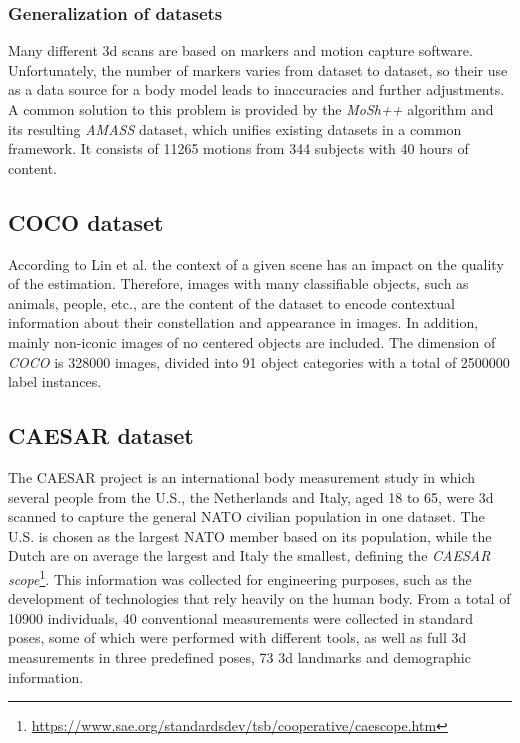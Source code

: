 \subsubsection{Generalization of datasets}
Many different 3d scans are based on markers and motion capture software. Unfortunately, the number of markers varies from dataset to dataset, so their use as a data source for a body model leads to inaccuracies and further adjustments. A common solution to this problem is provided by the \emph{MoSh++} algorithm and its resulting \emph{AMASS} dataset, which unifies existing datasets in a common framework. It consists of 11265 motions from 344 subjects with 40 hours of content.\cite{amass}

\subsection{COCO dataset} 
According to Lin et al. the context of a given scene has an impact on the quality of the estimation. Therefore, images with many classifiable objects, such as animals, people, etc., are the content of the dataset to encode contextual information about their constellation and appearance in images. In addition, mainly non-iconic images of no centered objects are included. The dimension of \emph{COCO} is 328000 images, divided into 91 object categories with a total of 2500000 label instances. \cite{coco}

\subsection{CAESAR dataset}
The CAESAR project is an international body measurement study in which several people from the U.S., the Netherlands and Italy, aged 18 to 65, were 3d scanned to capture the general NATO civilian population in one dataset. The U.S. is chosen as the largest NATO member based on its population, while the Dutch are on average the largest and Italy the smallest, defining the \emph{CAESAR scope}\footnote{\url{https://www.sae.org/standardsdev/tsb/cooperative/caescope.htm}}. This information was collected for engineering purposes, such as the development of technologies that rely heavily on the human body. From a total of 10900 individuals, 40 conventional measurements were collected in standard poses, some of which were performed with different tools, as well as full 3d measurements in three predefined poses, 73 3d landmarks and demographic information. \cite{caesar}